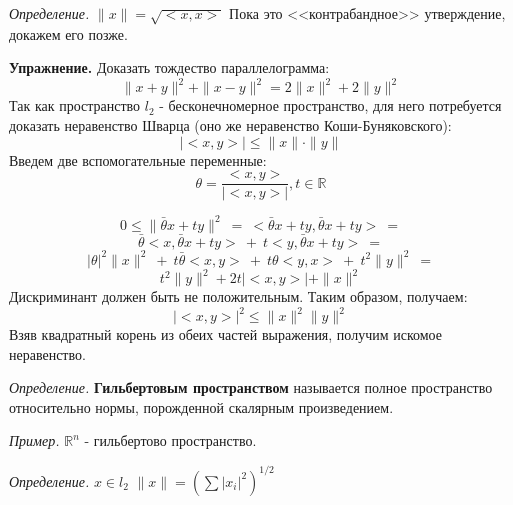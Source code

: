 \documentclass[12pt]{article}
\newcommand{\example}{{\itshape Пример. }}
\newcommand{\defi}{{\itshape Определение. }}
\newcommand{\exc}{{\bfseries Упражнение. }}
\renewcommand{\leq}{\leqslant}
\begin{document}
	\defi $\|x\| = \sqrt{<x, x>}$ {\color{gray} Пока это <<контрабандное>> утверждение, докажем его позже.}
	
	\exc Доказать тождество параллелограмма: 
	$$\|x+y\|^2 + \|x-y\|^2 = 2 \|x\|^2 + 2 \|y\|^2$$
	Так как пространство $l_2$ - бесконечномерное пространство, для него потребуется доказать неравенство Шварца (оно же неравенство
	Коши-Буняковского):
	$$|<x, y>| \leq \|x\| \cdot \|y\|$$
	Введем две вспомогательные переменные:
	$$\theta = \frac{<x, y>}{|<x, y>|}, t \in \mathbb{R}$$
	
	$$0 \leq \|\bar{\theta} x + t y\|^2 ~=~ <\bar{\theta} x + t y, \bar{\theta} x + t y> ~= $$
	$$\bar{\theta} <x, \bar{\theta} x + t y> ~+~ t <y, \bar{\theta} x + t y> ~= $$
	$$|\theta|^2 \|x\|^2 ~+~ t \bar{\theta} <x, y> ~+~ t \theta <y, x> ~+~ t^2 \|y\|^2 ~= $$
	$$t^2 \|y\|^2 + 2t |<x,y>| + \|x\|^2$$
	Дискриминант должен быть не положительным. Таким образом, получаем:
	$$|<x, y>|^2 \leq \|x\|^2 \|y\|^2$$
	Взяв квадратный корень из обеих частей выражения, получим искомое неравенство.
	
	\defi \textbf{Гильбертовым пространством} называется полное пространство относительно нормы, порожденной скалярным произведением.
	
	\example $\mathbb{R}^n$ - гильбертово пространство.
	
	\defi $x \in l_2$ $\|x\| = (\sum{|x_i|^2})^{1/2}$ 
\end{document}
